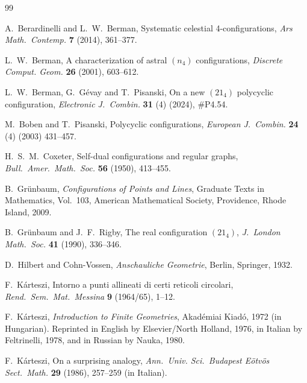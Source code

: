 \documentclass[12pt]{article}
\theoremstyle{definition} \newtheorem*{definition}              {Definition}
\theoremstyle{definition} \newtheorem {remark}                   {Remark}
\theoremstyle{definition} \newtheorem*{problem}                {Problem}
\theoremstyle{definition} \newtheorem{example}     [thm]{Example}
\begin{document}



% 
%  


\begin{thebibliography}{99} 


A.\ Berardinelli and L.\ W.\ Berman,
Systematic celestial 4-configurations,
\emph{Ars Math.\ Contemp.} {\bf 7} (2014), 361--377. 

L.\ W.\ Berman, A characterization of astral $(n_4)$ configurations, 
\emph{Discrete Comput. Geom.} {\bf 26}
(2001), 603--612.

L.\ W.\ Berman, G.\ G\'evay and T.\ Pisanski,
On a new $(21_4)$ polycyclic configuration,
\emph{Electronic J.\ Combin.} {\bf 31} (4) (2024), \#P4.54.

M.\ Boben and T.\ Pisanski,
Polycyclic configurations,
\emph{European J.\ Combin.} {\bf 24} (4) (2003) 431--457.

H.\ S.\ M.\ Coxeter, 
Self-dual configurations and regular graphs,
\emph{Bull.\ Amer.\ Math.\ Soc.} {\bf 56} (1950), 413--455.


B.\ Gr\"unbaum, 
\emph{Configurations of Points and Lines}, 
Graduate Texts in Mathematics, Vol.\ 103,
American Mathematical Society, Providence, Rhode Island, 2009.

B.\ Gr\"unbaum and J.\ F.\ Rigby, 
The real configuration $(21_4)$, 
\emph{J.\ London Math.\ Soc.} {\bf 41} (1990), 336--346.

D.\ Hilbert and Cohn-Vossen,
\emph{Anschauliche Geometrie},
Berlin, Springer, 1932.

F.\ K\'arteszi, 
Intorno a punti allineati di certi reticoli circolari, 
\emph{Rend.\ Sem.\ Mat.\ Messina} {\bf 9} (1964/65), 1--12.

F.\ K\'arteszi, 
\emph{Introduction to Finite Geometries},
Akadémiai Kiadó, 1972 (in Hungarian). 
Reprinted in English by Elsevier/North Holland, 1976, in Italian by Feltrinelli, 1978, and in Russian
by Nauka, 1980.

F.\ K\'arteszi,
On a surprising analogy,
\emph{Ann.\ Univ. Sci.\ Budapest Eötvös Sect.\ Math.} {\bf 29} (1986), 257--259 (in Italian).


\end{thebibliography}
\end{document}
